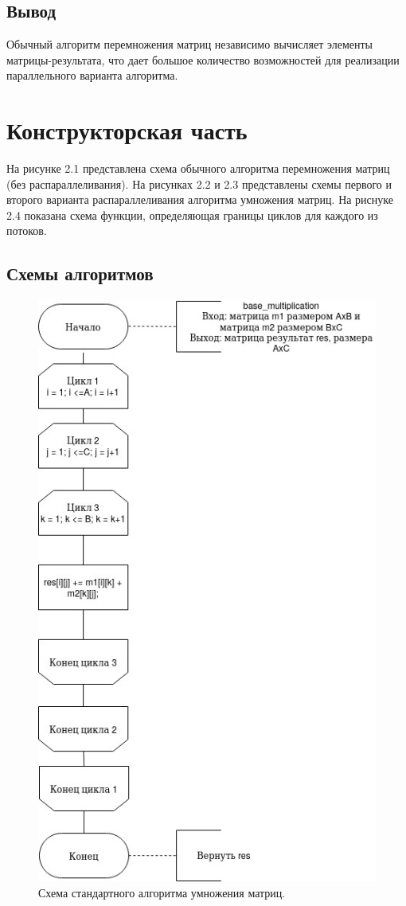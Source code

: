 \documentclass[12pt]{report}
\begin{document}
\section{Вывод}
	Обычный алгоритм перемножения матриц независимо вычисляет элементы матрицы-результата, что дает большое количество возможностей для реализации параллельного варианта алгоритма.
\clearpage

\chapter{Конструкторская часть}

На рисунке 2.1 представлена схема обычного алгоритма перемножения матриц (без распараллеливания). На рисунках 2.2 и 2.3 представлены схемы первого и второго варианта распараллеливания алгоритма умножения матриц. На риснуке 2.4 показана схема функции, определяющая границы циклов для каждого из потоков.

\section{Схемы алгоритмов}


\begin{figure}[h]
	\centering
	\includegraphics[scale=0.85]{base.jpg}
	\caption{Схема стандартного алгоритма умножения матриц.}
	\label{fig:mpr}
\end{figure}
\end{document}
